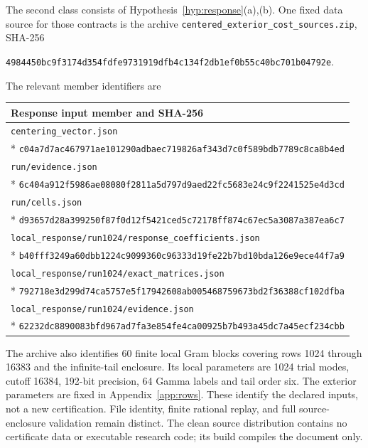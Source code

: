 The second class consists of Hypothesis~\ref{hyp:response}(a),(b).
One fixed data source for those contracts is the archive
\texttt{centered\_exterior\_cost\_sources.zip}, SHA-256
\begin{center}\small
\nolinkurl{4984450bc9f3174d354fdfe9731919dfb4c134f2db1ef0b55c40bc701b04792e}.
\end{center}
The relevant member identifiers are
\begingroup\small
\begin{longtable}{@{}p{}@{}}
\toprule Response input member and SHA-256\\\midrule\endhead
\texttt{centering\_vector.json}\\*
\nolinkurl{c04a7d7ac467971ae101290adbaec719826af343d7c0f589bdb7789c8ca8b4ed}\\[3pt]
\texttt{run/evidence.json}\\*
\nolinkurl{6c404a912f5986ae08080f2811a5d797d9aed22fc5683e24c9f2241525e4d3cd}\\[3pt]
\texttt{run/cells.json}\\*
\nolinkurl{d93657d28a399250f87f0d12f5421ced5c72178ff874c67ec5a3087a387ea6c7}\\[3pt]
\texttt{local\_response/run1024/response\_coefficients.json}\\*
\nolinkurl{b40fff3249a60dbb1224c9099360c96333d19fe22b7bd10bda126e9ece44f7a9}\\[3pt]
\texttt{local\_response/run1024/exact\_matrices.json}\\*
\nolinkurl{792718e3d299d74ca5757e5f17942608ab005468759673bd2f36388cf102dfba}\\[3pt]
\texttt{local\_response/run1024/evidence.json}\\*
\nolinkurl{62232dc8890083bfd967ad7fa3e854fe4ca00925b7b493a45dc7a45ecf234cbb}\\
\bottomrule
\end{longtable}\endgroup
The archive also identifies 60 finite local Gram blocks covering rows 1024 through 16383 and the infinite-tail enclosure.
Its local parameters are 1024 trial modes, cutoff 16384, 192-bit precision, 64 Gamma labels and tail order six.
The exterior parameters are fixed in Appendix~\ref{app:rows}.
These identify the declared inputs, not a new certification.
File identity, finite rational replay, and full source-enclosure validation remain distinct.
The clean source distribution contains no certificate data or executable research code; its build compiles the document only.
